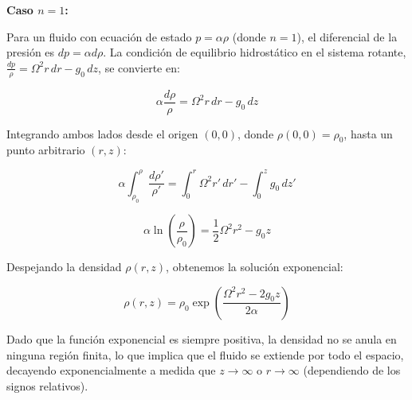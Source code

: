 \documentclass{article}
\begin{document}
\textbf{Caso $n = 1$:}

Para un fluido con ecuación de estado $p = \alpha \rho$ (donde $n=1$), el diferencial de la presión es $dp = \alpha d\rho$. La condición de equilibrio hidrostático en el sistema rotante, $\frac{dp}{\rho} = \Omega^2 r \, dr - g_0 \, dz$, se convierte en:

$$ \alpha \frac{d\rho}{\rho} = \Omega^2 r \, dr - g_0 \, dz $$

Integrando ambos lados desde el origen $(0,0)$, donde $\rho(0,0) = \rho_0$, hasta un punto arbitrario $(r,z)$:

$$ \alpha \int_{\rho_0}^{\rho} \frac{d\rho'}{\rho'} = \int_0^r \Omega^2 r' \, dr' - \int_0^z g_0 \, dz' $$

$$ \alpha \ln\left(\frac{\rho}{\rho_0}\right) = \frac{1}{2} \Omega^2 r^2 - g_0 z $$

Despejando la densidad $\rho(r,z)$, obtenemos la solución exponencial:

$$ \rho(r,z) = \rho_0 \exp\left( \frac{\Omega^2 r^2 - 2g_0 z}{2\alpha} \right) $$

Dado que la función exponencial es siempre positiva, la densidad no se anula en ninguna región finita, lo que implica que el fluido se extiende por todo el espacio, decayendo exponencialmente a medida que $z \to \infty$ o $r \to \infty$ (dependiendo de los signos relativos).
\end{document}
